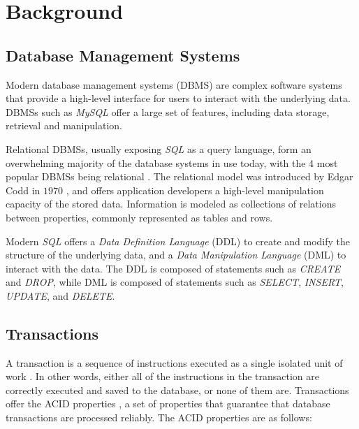 \chapter{Background}
 
\section{Database Management Systems}

Modern database management systems (DBMS) are complex software systems that provide a high-level interface for users to interact with the underlying data. DBMSs such as \textit{MySQL} \cite{mysqlwebpage} offer a large set of features, including data storage, retrieval and manipulation.

Relational DBMSs, usually exposing \textit{SQL} as a query language, form an overwhelming majority of the database systems in use today, with the 4 most popular DBMSs being relational \cite{akhtar2023popularity}. The relational model was introduced by Edgar Codd in $1970$ \cite{codd1970relational}, and offers application developers a high-level manipulation capacity of the stored data. Information is modeled as collections of relations between properties, commonly represented as tables and rows.

Modern \textit{SQL} offers a \textit{Data Definition Language} (DDL) to create and modify the structure of the underlying data, and a \textit{Data Manipulation Language} (DML) to interact with the data. The DDL is composed of statements such as \textit{CREATE} and \textit{DROP}, while DML is composed of statements such as \textit{SELECT}, \textit{INSERT}, \textit{UPDATE}, and \textit{DELETE}.

\section{Transactions}

A transaction is a sequence of instructions executed as a single isolated unit of work \cite{gray1981transaction}. In other words, either all of the instructions in the transaction are correctly executed and saved to the database, or none of them are. Transactions offer the ACID properties \cite{microsofttransaction}, a set of properties that guarantee that database transactions are processed reliably. The ACID properties are as follows:


